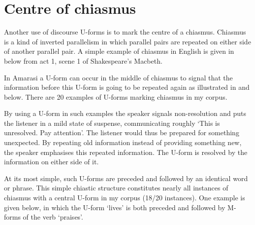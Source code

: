 \section{Centre of chiasmus}\label{sec:CenChi}
Another use of discourse U-forms is to mark the centre of a chiasmus.
Chiasmus is a kind of inverted parallelism in which parallel pairs
are repeated on either side of another parallel pair.
A simple example of chiasmus in English is given in 
below from act 1, scene 1 of Shakespeare's Macbeth.

\begin{exe}
	\label{ex:Macbeth}
\end{exe}

In Amarasi a U-form can occur in the middle of chiasmus to signal
that the information before this U-form
is going to be repeated again as illustrated in  and  below.
There are 20 examples of U-forms marking chiasmus in my corpus.

\begin{exe}
	\label{ex:ChiUfor}
		\begin{xlist}
		\end{xlist}
\end{exe}

\begin{exe}
	\label{ex:ChiUfor2}
\end{exe}

By using a U-form in such examples the speaker
signals non-resolution and puts the listener
in a mild state of suspense, communicating
roughly `This is unresolved. Pay attention'.
The listener would thus be prepared for something unexpected.
By repeating old information
instead of providing something new,
the speaker emphasises this repeated information.
The U-form is resolved by the information on either side of it.

At its most simple, such U-forms are preceded and followed
by an identical word or phrase.
This simple chiastic structure constitutes nearly all
instances of chiasmus with a central U-form in my corpus (18/20 instances).
One example is given  below,
in which the U-form  `lives' is both preceded and followed
by M-forms of the verb  `praises'.

